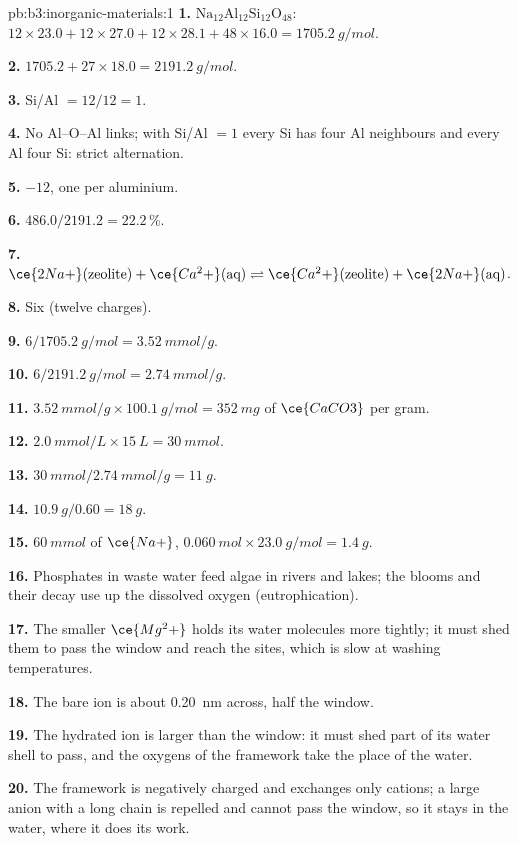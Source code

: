 \begin{solution}{pb:b3:inorganic-materials:1}
\textbf{1.} $\mathrm{Na_{12}Al_{12}Si_{12}O_{48}}$: $12 \times 23.0 + 12 \times 27.0 + 12 \times 28.1 + 48 \times 16.0 = \qty{1705.2}{g/mol}$.

\textbf{2.} $1705.2 + 27 \times 18.0 = \qty{2191.2}{g/mol}$.

\textbf{3.} Si/Al $= 12/12 = 1$.

\textbf{4.} No Al--O--Al links; with Si/Al $= 1$ every Si has four Al neighbours and every
Al four Si: strict alternation.

\textbf{5.} $-12$, one per aluminium.

\textbf{6.} $486.0/2191.2 = 22.2$\,\%.

\textbf{7.} $\ce{2Na+}(\text{zeolite}) + \ce{Ca^2+}(\text{aq}) \rightleftharpoons \ce{Ca^2+}(\text{zeolite}) + \ce{2Na+}(\text{aq})$.

\textbf{8.} Six (twelve charges).

\textbf{9.} $6/\qty{1705.2}{g/mol} = \qty{3.52}{mmol/g}$.

\textbf{10.} $6/\qty{2191.2}{g/mol} = \qty{2.74}{mmol/g}$.

\textbf{11.} $\qty{3.52}{mmol/g} \times \qty{100.1}{g/mol} = \qty{352}{mg}$ of $\ce{CaCO3}$ per gram.

\textbf{12.} $\qty{2.0}{mmol/L} \times \qty{15}{L} = \qty{30}{mmol}$.

\textbf{13.} $\qty{30}{mmol}/\qty{2.74}{mmol/g} = \qty{11}{g}$.

\textbf{14.} $\qty{10.9}{g}/0.60 = \qty{18}{g}$.

\textbf{15.} $\qty{60}{mmol}$ of $\ce{Na+}$, $\qty{0.060}{mol} \times \qty{23.0}{g/mol} = \qty{1.4}{g}$.

\textbf{16.} Phosphates in waste water feed algae in rivers and lakes; the blooms
and their decay use up the dissolved oxygen (eutrophication).

\textbf{17.} The smaller $\ce{Mg^2+}$ holds its water molecules more tightly; it must shed them
to pass the window and reach the sites, which is slow at washing temperatures.

\textbf{18.} The bare ion is about \qty{0.20}{nm} across, half the window.

\textbf{19.} The hydrated ion is larger than the window: it must shed part of its
water shell to pass, and the oxygens of the framework take the place of the
water.

\textbf{20.} The framework is negatively charged and exchanges only cations; a
large anion with a long chain is repelled and cannot pass the window, so it stays
in the water, where it does its work.


\end{solution}
